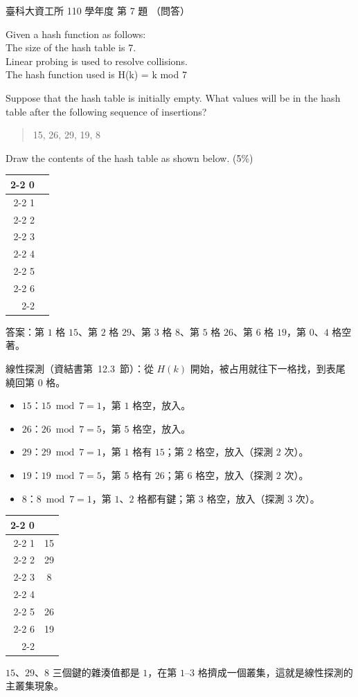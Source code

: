 \begin{pastexam}[label={px:ntust-110-ice-07}]{臺科大資工所 110 學年度 第 7 題}
（問答）

Given a hash function as follows:\\
The size of the hash table is 7.\\
Linear probing is used to resolve collisions.\\
The hash function used is H(k) = k mod 7

Suppose that the hash table is initially empty. What values will be in the hash table after the
following sequence of insertions?
\begin{quote}15, 26, 29, 19, 8\end{quote}
Draw the contents of the hash table as shown below. (5\%)
\begin{center}
\begin{tabular}{r|p{1.6cm}|}
\cline{2-2}
0 & \\ \cline{2-2}
1 & \\ \cline{2-2}
2 & \\ \cline{2-2}
3 & \\ \cline{2-2}
4 & \\ \cline{2-2}
5 & \\ \cline{2-2}
6 & \\ \cline{2-2}
\end{tabular}
\end{center}
\end{pastexam}

\begin{pastsoln}
答案：第 $1$ 格 $15$、第 $2$ 格 $29$、第 $3$ 格 $8$、第 $5$ 格 $26$、第 $6$ 格 $19$，第 $0$、$4$ 格空著。

線性探測（資結書第~12.3~節）：從 $H(k)$ 開始，被占用就往下一格找，到表尾繞回第 $0$ 格。
\begin{itemize}
\item $15$：$15 \bmod 7 = 1$，第 $1$ 格空，放入。
\item $26$：$26 \bmod 7 = 5$，第 $5$ 格空，放入。
\item $29$：$29 \bmod 7 = 1$，第 $1$ 格有 $15$；第 $2$ 格空，放入（探測 $2$ 次）。
\item $19$：$19 \bmod 7 = 5$，第 $5$ 格有 $26$；第 $6$ 格空，放入（探測 $2$ 次）。
\item $8$：$8 \bmod 7 = 1$，第 $1$、$2$ 格都有鍵；第 $3$ 格空，放入（探測 $3$ 次）。
\end{itemize}
\begin{center}
\begin{tabular}{r|c|}
\cline{2-2}
0 & \\ \cline{2-2}
1 & 15 \\ \cline{2-2}
2 & 29 \\ \cline{2-2}
3 & 8 \\ \cline{2-2}
4 & \\ \cline{2-2}
5 & 26 \\ \cline{2-2}
6 & 19 \\ \cline{2-2}
\end{tabular}
\end{center}
$15$、$29$、$8$ 三個鍵的雜湊值都是 $1$，在第 $1$--$3$ 格擠成一個叢集，這就是線性探測的主叢集現象。
\end{pastsoln}
